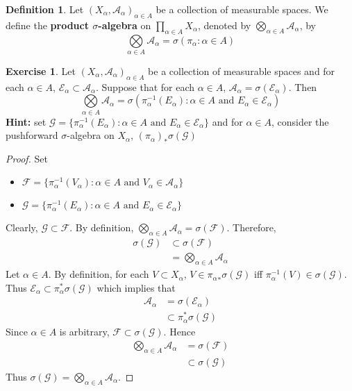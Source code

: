\documentclass{book}
\theoremstyle{definition}
\newtheorem{defn}[definition]{Definition}
\newtheorem{ex}[definition]{Exercise}
\newcommand{\al}{\alpha}
\newcommand{\sig}{\sigma}
\newcommand{\MA}{\mathcal{A}}
\newcommand{\ME}{\mathcal{E}}
\newcommand{\MF}{\mathcal{F}}
\newcommand{\MG}{\mathcal{G}}
\newcommand{\lex}[1]{\label{ex:#1}}
\newcommand{\ld}[1]{\label{defn:#1}}
\DeclareMathOperator*{\0}{\mbf{0}}
\DeclareMathOperator*{\1}{\mbf{1}}
\begin{document}
	\begin{defn} \ld{25001}
		Let $(X_{\al}, \MA_{\al})_{\al \in A}$ be a collection of measurable spaces. We define the \textbf{product $\sig$-algebra} on $\prod_{\al \in A}X_{\al}$, denoted by $\bigotimes\limits_{\al \in A} \MA_{\al}$, by $$\bigotimes\limits_{\al \in A} \MA_{\al} = \sig(\pi_{\al}: \al \in A)$$
	\end{defn}

	\begin{ex} \lex{25002}
		Let $(X_{\al}, \MA_{\al})_{\al \in A}$ be a collection of measurable spaces and for each $\al \in A$, $\ME_{\al} \subset \MA_{\al}$. Suppose that for each $\al \in A$, $\MA_{\al} = \sig(\ME_{\al})$. Then 
		$$\bigotimes\limits_{\al \in A} \MA_{\al} = \sig( \pi_{\al}^{-1}(E_{\al}): \al \in A \text{ and } E_{\al} \in \ME_{\al})$$ 
		\textbf{Hint:} set $\MG = \{\pi_{\al}^{-1}(E_{\al}): \al \in A \text{ and } E_{\al} \in \ME_{\al}\}$ and for $\al \in A$, consider the pushforward $\sig$-algebra on $X_{\al}$, $(\pi_{\al})_* \sig( \MG)$
	\end{ex}

 	\begin{proof}
 		Set 
 		\begin{itemize}
 			\item $\MF = \{\pi_{\al}^{-1}(V_{\al}): \al \in A \text{ and } V_{\al} \in \MA_{\al}\}$ 
 			\item $\MG = \{\pi_{\al}^{-1}(E_{\al}): \al \in A \text{ and } E_{\al} \in \ME_{\al}\}$
 		\end{itemize}
 		Clearly, $\MG \subset \MF$. By definition, $\bigotimes\limits_{\al \in A} \MA_{\al} = \sig(\MF)$. Therefore, 
 		\begin{align*}
 			\sig(\MG) 
 			& \subset \sig(\MF) \\
 			& = \bigotimes\limits_{\al \in A} \MA_{\al}
 		\end{align*}
 		Let $\al \in A$. By definition, for each $V \subset X_{\al}$, $V \in {\pi_{\al}}_* \sig(\MG)$ iff $\pi_{\al}^{-1}(V) \in \sig(\MG)$. Thus $\ME_{\al} \subset \pi_{\al}^* \sig(\MG)$ which implies that 
 		\begin{align*}
 			\MA_{\al} 
 			& = \sig(\ME_{\al}) \\
 			& \subset \pi_{\al}^* \sig(\MG)
 		\end{align*}
 		Since $\al \in A$ is arbitrary, $\MF \subset \sig(\MG)$. Hence 
 		\begin{align*}
 			\bigotimes\limits_{\al \in A} \MA_{\al} 
 			& = \sig(\MF) \\
 			& \subset \sig(\MG)
 		\end{align*}
 		Thus $\sig(\MG) = \bigotimes\limits_{\al \in A} \MA_{\al}$.
 	\end{proof}
 
\end{document}
